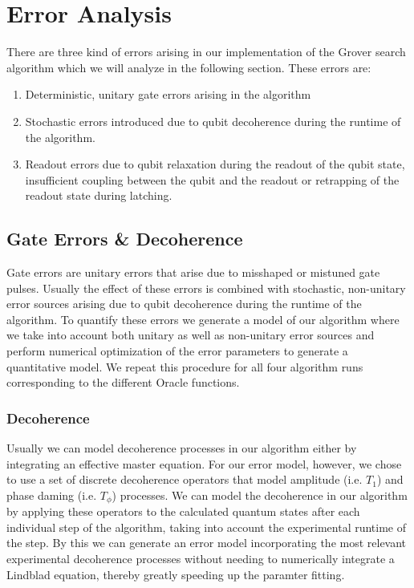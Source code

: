 \section{Error Analysis}

There are three kind of errors arising in our implementation of the Grover search algorithm which we will analyze in the following section. These errors are:

\begin{enumerate}
	\item Deterministic, unitary gate errors arising in the algorithm
	\item Stochastic errors introduced due to qubit decoherence during the runtime of the algorithm.
	\item Readout errors due to qubit relaxation during the readout of the qubit state, insufficient coupling between the qubit and the readout or retrapping of the readout state during latching.
\end{enumerate}

\subsection{Gate Errors \& Decoherence}

Gate errors are unitary errors that arise due to misshaped or mistuned gate pulses. Usually the effect of these errors is combined with stochastic, non-unitary error sources arising due to qubit decoherence during the runtime of the algorithm. To quantify these errors we generate a model of our algorithm where we take into account both unitary as well as non-unitary error sources and perform numerical optimization of the error parameters to generate a quantitative model. We repeat this procedure for all four algorithm runs corresponding to the different Oracle functions.

\subsubsection{Decoherence}

Usually we can model decoherence processes in our algorithm either by integrating an effective master equation. For our error model, however, we chose to use a set of discrete decoherence operators that model amplitude (i.e. $T_1$) and phase daming (i.e. $T_\phi$) processes. We can model the decoherence in our algorithm by applying these operators to the calculated quantum states after each individual step of the algorithm, taking into account the experimental runtime of the step. By this we can generate an error model incorporating the most relevant experimental decoherence processes without needing to numerically integrate a Lindblad equation, thereby greatly speeding up the paramter fitting.

